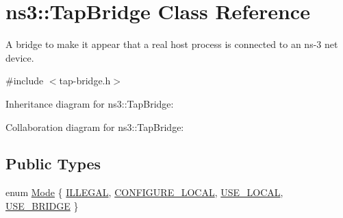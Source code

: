 \hypertarget{classns3_1_1TapBridge}{}\section{ns3\+:\+:Tap\+Bridge Class Reference}
\label{classns3_1_1TapBridge}


A bridge to make it appear that a real host process is connected to an ns-\/3 net device.  




{\ttfamily \#include $<$tap-\/bridge.\+h$>$}



Inheritance diagram for ns3\+:\+:Tap\+Bridge\+:


Collaboration diagram for ns3\+:\+:Tap\+Bridge\+:
\subsection*{Public Types}
\begin{DoxyCompactItemize}
\item 
enum \hyperlink{classns3_1_1TapBridge_acac8d3ebe259ddfa9cd369515f04618d}{Mode} \{ \hyperlink{classns3_1_1TapBridge_acac8d3ebe259ddfa9cd369515f04618da4616b74b41720604c7516c9349b2d3fe}{I\+L\+L\+E\+G\+AL}, 
\hyperlink{classns3_1_1TapBridge_acac8d3ebe259ddfa9cd369515f04618daf2d0f6c8152d38e9400b2d9fd35f02a3}{C\+O\+N\+F\+I\+G\+U\+R\+E\+\_\+\+L\+O\+C\+AL}, 
\hyperlink{classns3_1_1TapBridge_acac8d3ebe259ddfa9cd369515f04618daa73ff9ba9e1659aeda35d7181b601c75}{U\+S\+E\+\_\+\+L\+O\+C\+AL}, 
\hyperlink{classns3_1_1TapBridge_acac8d3ebe259ddfa9cd369515f04618da33daa0eda93d6ec20fc491d7c440fc8d}{U\+S\+E\+\_\+\+B\+R\+I\+D\+GE}
 \}
\end{DoxyCompactItemize}
